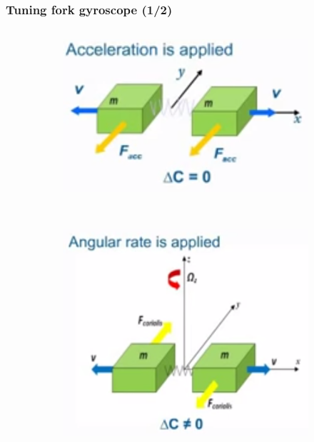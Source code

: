 \documentclass[10pt]{beamer}
\begin{document}
\begin{frame}
\frametitle{Tuning fork gyroscope (1/2)}
\begin{columns}
    \begin{column}{.48\textwidth}
        \begin{figure}
        \centering
            \begin{subfigure}[t]{0.9\textwidth}
                \centering
                \includegraphics[width=\linewidth]{GyroAcc.png}
            \end{subfigure}
            ~
            \begin{subfigure}[t]{0.9\textwidth}
                \centering
                \includegraphics[width=\linewidth]{GyroAngRate.png}
            \end{subfigure}

\end{figure}
\end{column}
\end{columns}
\end{frame}
\end{document}
